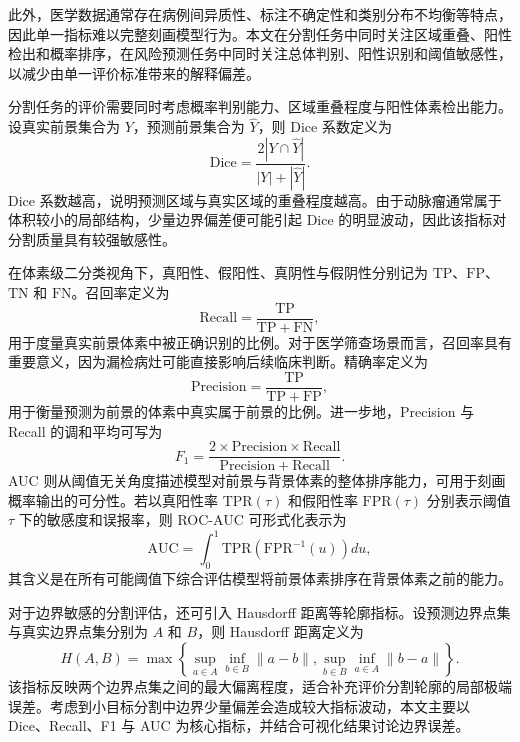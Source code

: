 此外，医学数据通常存在病例间异质性、标注不确定性和类别分布不均衡等特点，因此单一指标难以完整刻画模型行为。本文在分割任务中同时关注区域重叠、阳性检出和概率排序，在风险预测任务中同时关注总体判别、阳性识别和阈值敏感性，以减少由单一评价标准带来的解释偏差。

分割任务的评价需要同时考虑概率判别能力、区域重叠程度与阳性体素检出能力。设真实前景集合为 $Y$，预测前景集合为 $\hat{Y}$，则 Dice 系数定义为
\begin{equation}
\mathrm{Dice}=\frac{2|Y\cap \hat{Y}|}{|Y|+|\hat{Y}|}.
\end{equation}
Dice 系数越高，说明预测区域与真实区域的重叠程度越高。由于动脉瘤通常属于体积较小的局部结构，少量边界偏差便可能引起 Dice 的明显波动，因此该指标对分割质量具有较强敏感性。

在体素级二分类视角下，真阳性、假阳性、真阴性与假阴性分别记为 $\mathrm{TP}$、$\mathrm{FP}$、$\mathrm{TN}$ 和 $\mathrm{FN}$。召回率定义为
\begin{equation}
\mathrm{Recall}=\frac{\mathrm{TP}}{\mathrm{TP}+\mathrm{FN}},
\end{equation}
用于度量真实前景体素中被正确识别的比例。对于医学筛查场景而言，召回率具有重要意义，因为漏检病灶可能直接影响后续临床判断。精确率定义为
\begin{equation}
\mathrm{Precision}=\frac{\mathrm{TP}}{\mathrm{TP}+\mathrm{FP}},
\end{equation}
用于衡量预测为前景的体素中真实属于前景的比例。进一步地，Precision 与 Recall 的调和平均可写为
\begin{equation}
F_1=\frac{2\times \mathrm{Precision}\times \mathrm{Recall}}{\mathrm{Precision}+\mathrm{Recall}}.
\end{equation}
AUC 则从阈值无关角度描述模型对前景与背景体素的整体排序能力，可用于刻画概率输出的可分性。若以真阳性率 $\mathrm{TPR}(\tau)$ 和假阳性率 $\mathrm{FPR}(\tau)$ 分别表示阈值 $\tau$ 下的敏感度和误报率，则 ROC-AUC 可形式化表示为
\begin{equation}
\mathrm{AUC}=\int_{0}^{1}\mathrm{TPR}\left(\mathrm{FPR}^{-1}(u)\right)du,
\end{equation}
其含义是在所有可能阈值下综合评估模型将前景体素排序在背景体素之前的能力。

对于边界敏感的分割评估，还可引入 Hausdorff 距离等轮廓指标。设预测边界点集与真实边界点集分别为 $A$ 和 $B$，则 Hausdorff 距离定义为
\begin{equation}
H(A,B)=\max\left\{\sup_{a\in A}\inf_{b\in B}\|a-b\|,\sup_{b\in B}\inf_{a\in A}\|b-a\|\right\}.
\end{equation}
该指标反映两个边界点集之间的最大偏离程度，适合补充评价分割轮廓的局部极端误差。考虑到小目标分割中边界少量偏差会造成较大指标波动，本文主要以 Dice、Recall、F1 与 AUC 为核心指标，并结合可视化结果讨论边界误差。

